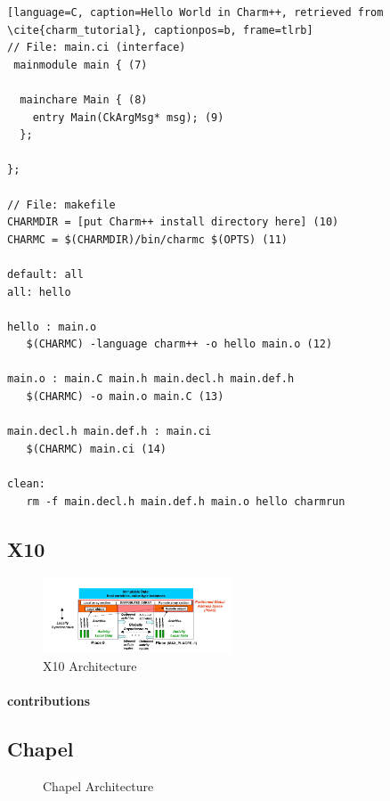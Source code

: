 \begin{minipage}{0.45\textwidth}

\begin{lstlisting}[language=C, caption=Hello World in Charm++, retrieved from \cite{charm_tutorial}, captionpos=b, frame=tlrb]
// File: main.ci (interface)
 mainmodule main { (7)

  mainchare Main { (8)
    entry Main(CkArgMsg* msg); (9)
  };

};

// File: makefile
CHARMDIR = [put Charm++ install directory here] (10)
CHARMC = $(CHARMDIR)/bin/charmc $(OPTS) (11)

default: all
all: hello

hello : main.o
   $(CHARMC) -language charm++ -o hello main.o (12)

main.o : main.C main.h main.decl.h main.def.h
   $(CHARMC) -o main.o main.C (13)

main.decl.h main.def.h : main.ci
   $(CHARMC) main.ci (14)

clean:
   rm -f main.decl.h main.def.h main.o hello charmrun
\end{lstlisting}
\end{minipage}
\normalsize

\subsection{X10}
    \begin{figure}[h]
		\centering
		\includegraphics[width=0.50\textwidth]{Figures/x10_arch.png}
        \caption{X10 Architecture}
        \label{fig:x10_arch}
    \end{figure}

\paragraph{contributions}

\subsection{Chapel}
    \begin{figure}[h]
        \caption{Chapel Architecture}
        \label{fig:chapel_arch}
    \end{figure}

